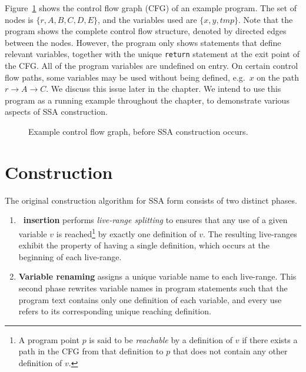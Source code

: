 {Figure~\ref{fig:classical_construction_algorithm:examplecfg}
shows the control flow graph (CFG) of an example
program. The set of nodes is $\{ r, A, B, C, D, E\}$, and
the variables used are $\{ x, y, \textit{tmp} \}$.
Note that the program shows the complete control flow structure,
denoted by directed edges between the nodes.
However, the program only shows 
statements that define relevant variables, together with the
unique \texttt{return} statement at the exit point of the CFG.
All of the program variables are undefined on entry. On certain
control flow paths, some variables may be used without being defined, 
e.g.\ $x$ on the path $r \rightarrow A \rightarrow C$. 
We discuss this issue later in the chapter.
We intend to use this program as a running example
throughout the chapter,
to demonstrate various aspects of SSA construction.


\begin{figure}
  \begin{center}
  \end{center}
\caption{\label{fig:classical_construction_algorithm:examplecfg}Example control flow graph, before
  SSA construction occurs.}
\end{figure}

\section{Construction}
\label{sec:classical_construction}

The original construction algorithm for SSA form 
consists of two distinct phases.
\begin{enumerate}
\item \textbf{\phifun\ insertion} performs \textit{live-range splitting} to ensures that any use of a given variable $v$ is reached\footnote{A program point $p$ is said to be \emph{reachable} by a definition of $v$ if there exists a path in the CFG from that definition to $p$ that does not contain any other definition of $v$.}  by exactly one definition of $v$. 
The resulting live-ranges exhibit the property of having a single definition, which occurs at the beginning of each live-range.
\item \textbf{Variable renaming} assigns a unique variable name to each live-range. This second phase rewrites variable names in program statements such that the program text contains only one definition of each variable, and every use refers to its corresponding unique reaching definition.
\end{enumerate}

}
